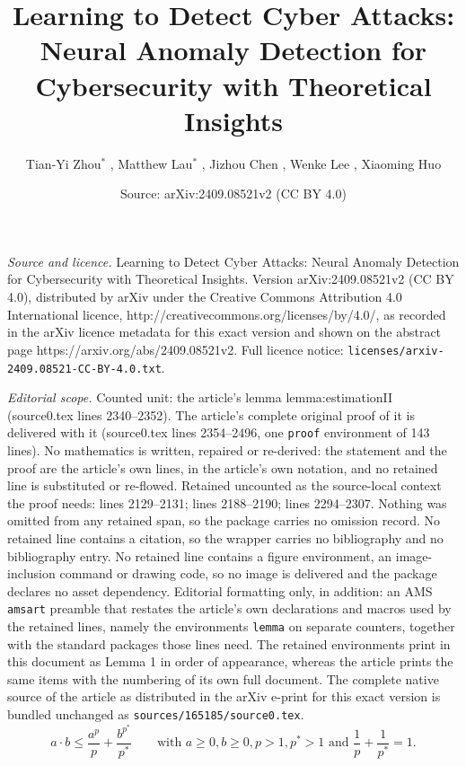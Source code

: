 \documentclass[10pt,a4paper]{amsart}
\title{Learning to Detect Cyber Attacks: Neural Anomaly Detection for Cybersecurity with Theoretical Insights}
\author{Tian-Yi Zhou$^*$ , Matthew Lau$^*$ , Jizhou Chen , Wenke Lee , Xiaoming Huo}
\date{Source: arXiv:2409.08521v2 (CC BY 4.0)}
\begin{document}
\maketitle

\noindent\emph{Source and licence.} Learning to Detect Cyber Attacks: Neural Anomaly Detection for Cybersecurity with Theoretical Insights. Version arXiv:2409.08521v2 (CC BY 4.0), distributed by arXiv under the Creative Commons Attribution 4.0 International licence, http://creativecommons.org/licenses/by/4.0/, as recorded in the arXiv licence metadata for this exact version and shown on the abstract page https://arxiv.org/abs/2409.08521v2. Full licence notice: \texttt{licenses/arxiv-2409.08521-CC-BY-4.0.txt}.\par\smallskip

\noindent\textit{Editorial scope.} Counted unit: the article's lemma lemma:estimationII (source0.tex lines 2340--2352). The article's complete original proof of it is delivered with it (source0.tex lines 2354--2496, one \texttt{proof} environment of 143 lines). No mathematics is written, repaired or re-derived: the statement and the proof are the article's own lines, in the article's own notation, and no retained line is substituted or re-flowed.  Retained uncounted as the source-local context the proof needs: lines 2129--2131; lines 2188--2190; lines 2294--2307.  Nothing was omitted from any retained span, so the package carries no omission record.  No retained line contains a citation, so the wrapper carries no bibliography and no bibliography entry.  No retained line contains a figure environment, an image-inclusion command or drawing code, so no image is delivered and the package declares no asset dependency.  Editorial formatting only, in addition: an AMS \texttt{amsart} preamble that restates the article's own declarations and macros used by the retained lines, namely the environments \texttt{lemma} on separate counters, together with the standard packages those lines need.  The retained environments print in this document as Lemma 1 in order of appearance, whereas the article prints the same items with the numbering of its own full document.  The complete native source of the article as distributed in the arXiv e-print for this exact version is bundled unchanged as \texttt{sources/165185/source0.tex}.
 \begin{equation}\label{Young}
        a\cdot b \leq \frac{a^p}{p}+ \frac{b^{p^*}}{p^*} \qquad \text{with    } a\geq 0,b \geq 0, p>1,p^*>1 \text{ and } \frac{1}{p}+ \frac{1}{p^*} = 1.
    \end{equation}
\end{document}
